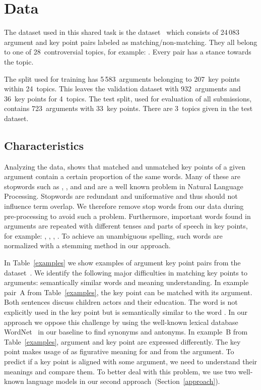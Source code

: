 \section{Data}\label{data}

The dataset used in this shared task is the \ArgKP dataset~\cite{Bar-HaimEFKLS2020} which consists of 24\,083 argument 
and key point pairs labeled as matching/non-matching. They all belong to one of 28~controversial topics, for example: 
. Every pair has a stance towards the topic. 

The split used for training has 5\,583~arguments belonging to 207~key points within 24~topics. This leaves the 
validation dataset with 932~arguments and 36~key points for 4~topics. The test split, used for evaluation of 
all submissions, contains 723~arguments with 33~key points. There are 3~topics given in the test dataset.

\subsection{Characteristics}


Analyzing the data, shows that matched and unmatched key points of a given argument contain a certain proportion of the same words. 
Many of these are stopwords such as , , and  and are a well known problem in Natural Language Processing.
Stopwords are redundant and uniformative and thus should not influence term overlap.
We therefore remove stop words from our data during pre-processing to avoid such a problem. 
Furthermore, important words found in arguments are repeated with different tenses and parts of speech in key points, for example: 
, , , . 
To achieve an unambiguous spelling, such words are normalized with a stemming method in our approach. 

In Table~\ref{examples} we show examples of argument key point pairs from the \ArgKP dataset~\cite{Bar-HaimEFKLS2020}. 
We identify the following major difficulties in matching key points to arguments: semantically similar words and meaning understanding.
In example pair~A from Table~\ref{examples}, the key point can be matched with its argument. Both sentences discuss 
children actors and their education. The word  is not explicitly used in the key point but is semantically similar to the word . 
In our approach we oppose this challenge by using the well-known lexical database WordNet~\cite{Miller1995} in our 
baseline to find synonyms and antonyms.
In example~B from Table~\ref{examples}, argument and key point are expressed differently. 
The key point makes usage of  as figurative meaning for  and  from the argument. 
To predict if a key point is aligned with some argument, we need to understand their meanings and compare them. 
To better deal with this problem, we use two well-known language models in our second approach~(Section~\ref{approach}). 

